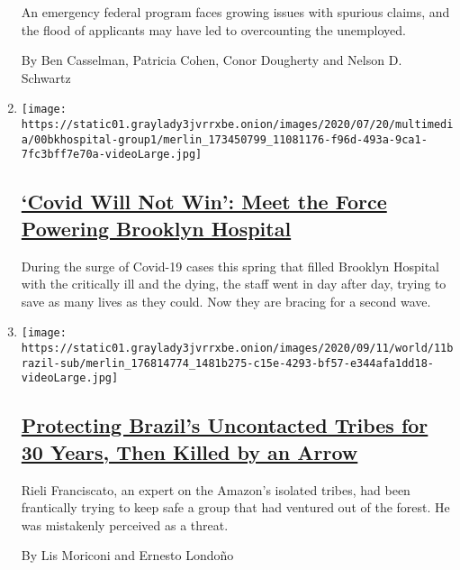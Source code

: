 \begin{enumerate}
  An emergency federal program faces growing issues with spurious
  claims, and the flood of applicants may have led to overcounting the
  unemployed.

  By Ben Casselman, Patricia Cohen, Conor Dougherty and Nelson D.
  Schwartz
\item
  \texttt{[image: https://static01.graylady3jvrrxbe.onion/images/2020/07/20/multimedia/00bkhospital-group1/merlin\_173450799\_11081176-f96d-493a-9ca1-7fc3bff7e70a-videoLarge.jpg]}

  \hypertarget{covid-will-not-win-meet-the-force-powering-brooklyn-hospital}{%
  \subsection{\texorpdfstring{\href{/2020/09/11/nyregion/coronavirus-brooklyn-hospital-workers.html}{`Covid
  Will Not Win': Meet the Force Powering Brooklyn
  Hospital}}{`Covid Will Not Win': Meet the Force Powering Brooklyn Hospital}}\label{covid-will-not-win-meet-the-force-powering-brooklyn-hospital}}

  During the surge of Covid-19 cases this spring that filled Brooklyn
  Hospital with the critically ill and the dying, the staff went in day
  after day, trying to save as many lives as they could. Now they are
  bracing for a second wave.
\item
  \texttt{[image: https://static01.graylady3jvrrxbe.onion/images/2020/09/11/world/11brazil-sub/merlin\_176814774\_1481b275-c15e-4293-bf57-e344afa1dd18-videoLarge.jpg]}

  \hypertarget{protecting-brazils-uncontacted-tribes-for-30-years-then-killed-by-an-arrow}{%
  \subsection{\texorpdfstring{\href{/2020/09/11/world/americas/brazil-uncontacted-tribes.html}{Protecting
  Brazil's Uncontacted Tribes for 30 Years, Then Killed by an
  Arrow}}{Protecting Brazil's Uncontacted Tribes for 30 Years, Then Killed by an Arrow}}\label{protecting-brazils-uncontacted-tribes-for-30-years-then-killed-by-an-arrow}}

  Rieli Franciscato, an expert on the Amazon's isolated tribes, had been
  frantically trying to keep safe a group that had ventured out of the
  forest. He was mistakenly perceived as a threat.

  By Lis Moriconi and Ernesto Londoño
\end{enumerate}

